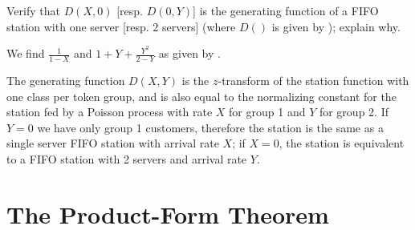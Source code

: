 {Verify  that $ D(X,0)$
 [resp. $ D(0,Y)$]
 is the generating function of a FIFO station with one server
 [resp. 2 servers] (where
 $ D()$ is given by ); explain why.}
 {We find $\frac{1}{1-X}$ and $1+Y+\frac{Y^2}{2-Y}$ as
 given by .

 The generating function $ D(X,Y)$ is the $z$-transform
 of the station function with one class per token group, and
 is also equal to the normalizing constant for the station fed
  by a Poisson process with rate $X$ for group 1 and $Y$ for group 2.
If $Y=0$ we have only group 1 customers,
therefore the station is the same as a single
server FIFO station with arrival rate $X$; if
$X=0$, the station is equivalent to a FIFO
station with 2 servers and arrival rate $Y$.}


\section{The Product-Form Theorem}

